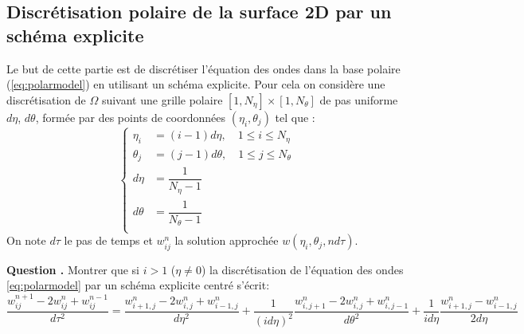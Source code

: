 \documentclass[a4,12pt]{article}
\newcounter{Nbquestion}
\newcommand*\question{%
\stepcounter{Nbquestion}%
\textbf{Question \theNbquestion. }}
\begin{document}
\subsection{Discrétisation polaire de la surface 2D par un schéma explicite }
Le but de cette partie est de discrétiser l'équation des ondes dans la base polaire (\ref{eq:polarmodel}) en utilisant un schéma explicite. Pour cela on considère une discrétisation de $\Omega $ suivant une grille polaire $[1,N_\eta]\times [1,N_\theta]$ de pas uniforme $d\eta$, $d\theta$, formée par des points de coordonnées $(\eta_i,\theta_j)$ tel que :
\begin{equation*}{}
	\left\{
	\begin{array}{rl}
		\eta_i &=(i-1) d\eta,\quad 1\leq i \leq N_\eta \\
		\theta_j &=(j-1) d \theta,\quad  1\leq j \leq N_\theta \\
 		d\eta& =\dfrac{1}{N_\eta-1}\\
		 d\theta &=\dfrac{1}{N_{\theta}-1}\\
	\end{array}
	\right.
\end{equation*}
On note $d\tau$ le pas de temps et $w_{ij}^{n}$ la solution approchée $w(\eta_i,\theta_j,nd\tau)$. 
\begin{mdframed}[style=exampledefault]
\question Montrer que si $i>1$ ($\eta \neq 0$) la discrétisation de l'équation des ondes \ref{eq:polarmodel} par un schéma explicite centré s'écrit:
\footnotesize{
\begin{equation} 
	\frac{w_{ij}^{n+1}-2w_{ij}^{n}+w_{ij}^{n-1}}{d\tau^{2}}=\frac{w_{i+1,j}^{n}-2w_{i,j}^{n}+w_{i-1,j}^{n}}{d\eta^{2}}+\frac{1}{(i d\eta)^2} \frac{w_{i,j+1}^{n}-2w_{i,j}^{n}+w_{i,j-1}^{n}}{d\theta^{2}}+\frac{1}{id\eta}\frac{w_{i+1,j}^{n}-w_{i-1,j}^{n}}{2d\eta}
	\label{dispol}
\end{equation}
}
\end{mdframed}
\end{document}
